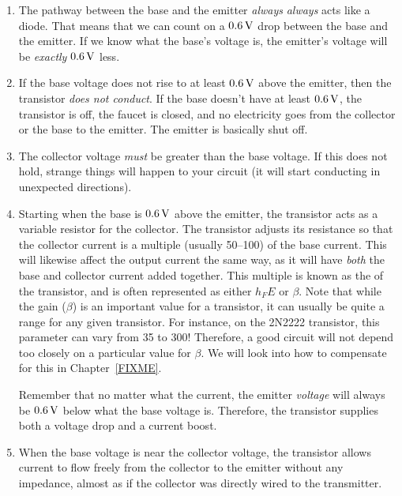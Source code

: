 \begin{enumerate}

\item The pathway between the base and the emitter \emph{always} \emph{always} acts like a diode.
That means that we can count on a $0.6\,\si{\volt}$ drop between the base and the emitter.
If we know what the base's voltage is, the emitter's voltage will be \emph{exactly} $0.6\,\si{\volt}$ less.

\item If the base voltage does not rise to at least $0.6\,\si{\volt}$ above the emitter, then the transistor \emph{does not conduct}.  If the base doesn't have at least $0.6\,\si{\volt}$, the transistor is off, the faucet is closed, and no electricity goes from the collector or the base to the emitter.
The emitter is basically shut off.

\item The collector voltage \emph{must} be greater than the base voltage.
If this does not hold, strange things will happen to your circuit (it will start conducting in unexpected directions).

\item Starting when the base is $0.6\,\si{\volt}$ above the emitter, the transistor acts as a variable resistor for the collector.
The transistor adjusts its resistance so that the collector current is a multiple (usually 50--100) of the base current.
This will likewise affect the output current the same way, as it will have \emph{both} the base and collector current added together.
This multiple is known as the  of the transistor, and is often represented as either $h_FE$ or $\beta$.
Note that while the gain ($\beta$) is an important value for a transistor, it can usually be quite a range for any given transistor.
For instance, on the 2N2222 transistor, this parameter can vary from 35 to 300!
Therefore, a good circuit will not depend too closely on a particular value for $\beta$.
We will look into how to compensate for this in Chapter~\ref{FIXME}.

Remember that no matter what the current, the emitter \emph{voltage} will always be $0.6\,\si{\volt}$ below what the base voltage is.
Therefore, the transistor supplies both a voltage drop and a current boost.

\item When the base voltage is near the collector voltage, the transistor allows current to flow freely from the collector to the emitter without any impedance, almost as if the collector was directly wired to the transmitter.
\end{enumerate}

